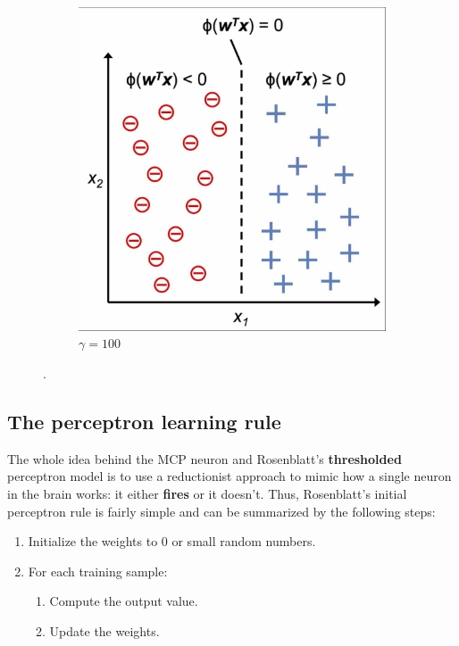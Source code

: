 \documentclass[11pt]{article}
\begin{document}
\begin{figure}[hbt!]
\begin{subfigure}[t]{.48\textwidth}
            \includegraphics[width=\columnwidth,trim=4 4 4 4,clip]{img/perceptron_b.png}
            \caption{$\gamma=100$}
            \label{fig:perc_lin_class}
        \end{subfigure}
        \caption{.}
        \label{fig:perceptron}
    \end{figure}

    \subsection{The perceptron learning rule} \label{subsec:perc_learn_rule}

    The whole idea behind the MCP neuron and Rosenblatt's \textbf{thresholded} perceptron model is to use a reductionist approach to mimic how a single neuron in the brain works: it either \textbf{fires} or it doesn't.
    Thus, Rosenblatt's initial perceptron rule is fairly simple and can be summarized by the following steps:

    \begin{enumerate}
        \item Initialize the weights to 0 or small random numbers.
        \item For each training sample:
        \begin{enumerate}
            \item Compute the output value.
            \item Update the weights.
        \end{enumerate}
    \end{enumerate}
\end{document}
